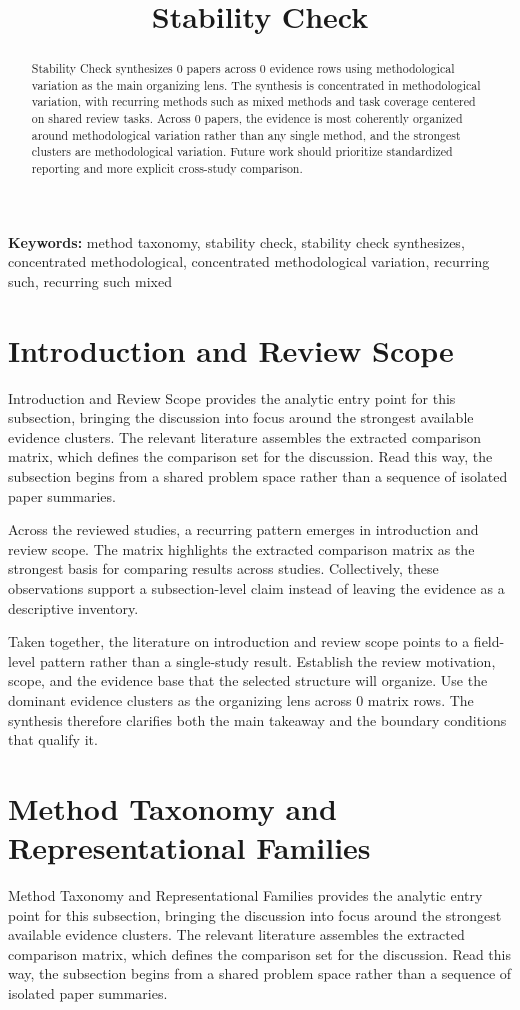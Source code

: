 \documentclass{article}
\title{Stability Check}
\begin{document}
\maketitle
\begin{abstract}
Stability Check synthesizes 0 papers across 0 evidence rows using methodological variation as the main organizing lens. The synthesis is concentrated in methodological variation, with recurring methods such as mixed methods and task coverage centered on shared review tasks. Across 0 papers, the evidence is most coherently organized around methodological variation rather than any single method, and the strongest clusters are methodological variation. Future work should prioritize standardized reporting and more explicit cross-study comparison.
\end{abstract}
\noindent\textbf{Keywords:} method taxonomy, stability check, stability check synthesizes, concentrated methodological, concentrated methodological variation, recurring such, recurring such mixed
\section{Introduction and Review Scope}
Introduction and Review Scope provides the analytic entry point for this subsection, bringing the discussion into focus around the strongest available evidence clusters. The relevant literature assembles the extracted comparison matrix, which defines the comparison set for the discussion. Read this way, the subsection begins from a shared problem space rather than a sequence of isolated paper summaries.

Across the reviewed studies, a recurring pattern emerges in introduction and review scope. The matrix highlights the extracted comparison matrix as the strongest basis for comparing results across studies. Collectively, these observations support a subsection-level claim instead of leaving the evidence as a descriptive inventory.

Taken together, the literature on introduction and review scope points to a field-level pattern rather than a single-study result. Establish the review motivation, scope, and the evidence base that the selected structure will organize. Use the dominant evidence clusters as the organizing lens across 0 matrix rows. The synthesis therefore clarifies both the main takeaway and the boundary conditions that qualify it.

\section{Method Taxonomy and Representational Families}
Method Taxonomy and Representational Families provides the analytic entry point for this subsection, bringing the discussion into focus around the strongest available evidence clusters. The relevant literature assembles the extracted comparison matrix, which defines the comparison set for the discussion. Read this way, the subsection begins from a shared problem space rather than a sequence of isolated paper summaries.
\end{document}
